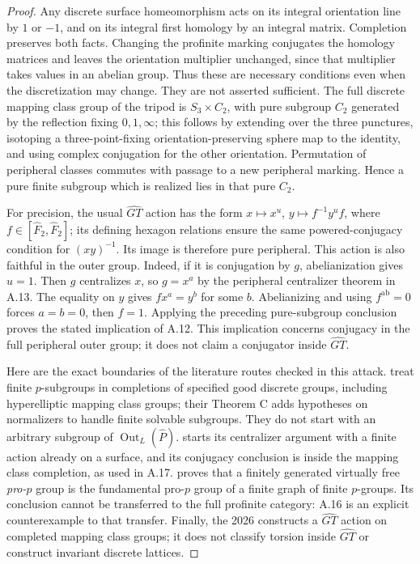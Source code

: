 \begin{proof}
Any discrete surface homeomorphism acts on its integral
orientation line by $1$ or $-1$, and on its integral first
homology by an integral matrix. Completion preserves both
facts. Changing the profinite marking conjugates the
homology matrices and leaves the orientation multiplier
unchanged, since that multiplier takes values in an abelian
group. Thus these are necessary conditions even when the
discretization may change. They are not asserted sufficient.
The full discrete mapping class group of the tripod is
$S_3\times C_2$, with pure subgroup $C_2$ generated by the
reflection fixing $0,1,\infty$; this follows by extending
over the three punctures, isotoping a three-point-fixing
orientation-preserving sphere map to the identity, and
using complex conjugation for the other orientation.
Permutation of peripheral classes commutes with passage
to a new peripheral marking. Hence a pure finite subgroup
which is realized lies in that pure $C_2$.

For precision, the usual $\widehat{GT}$ action has the
form $x\mapsto x^u$, $y\mapsto f^{-1}y^u f$, where
$f\in[\widehat F_2,\widehat F_2]$; its defining
hexagon relations ensure the same powered-conjugacy
condition for $(xy)^{-1}$. Its image is therefore pure
peripheral. This action is also faithful in the outer
group. Indeed, if it is conjugation by $g$, abelianization
gives $u=1$. Then $g$ centralizes $x$, so $g=x^a$ by
the peripheral centralizer theorem in A.13. The equality
on $y$ gives $fx^a=y^b$ for some $b$. Abelianizing and
using $f^{\mathrm{ab}}=0$ forces $a=b=0$, then $f=1$.
Applying the preceding pure-subgroup conclusion proves
the stated implication of A.12. This implication concerns
conjugacy in the full peripheral outer group; it does not
claim a conjugator inside $\widehat{GT}$.

Here are the exact boundaries of the literature routes
checked in this attack. \citet[Theorem A and Theorem 6.2]{BoggiZalesskii2025}
treat finite $p$-subgroups in completions of specified good
discrete groups, including hyperelliptic mapping class
groups; their Theorem C adds hypotheses on normalizers
to handle finite solvable subgroups. They do not start
with an arbitrary subgroup of
$\operatorname{Out}_L(\widehat P)$.
\citet[Theorems A, 4.1 and 5.1]{Boggi2026Symmetric}
starts its centralizer argument with a finite action
already on a surface, and its conjugacy conclusion is
inside the mapping class completion, as used in A.17.
\citet[Theorem 1.1]{HerfortZalesskii2013} proves that a
finitely generated virtually free \emph{pro-$p$} group
is the fundamental pro-$p$ group of a finite graph of
finite $p$-groups. Its conclusion cannot be transferred
to the full profinite category: A.16 is an explicit
counterexample to that transfer. Finally, the 2026
\citet[Theorem 1.1]{LochakNakamuraSchneps2026} constructs
a $\widehat{GT}$ action on completed mapping class
groups; it does not classify torsion inside
$\widehat{GT}$ or construct invariant discrete lattices.


\end{proof}
